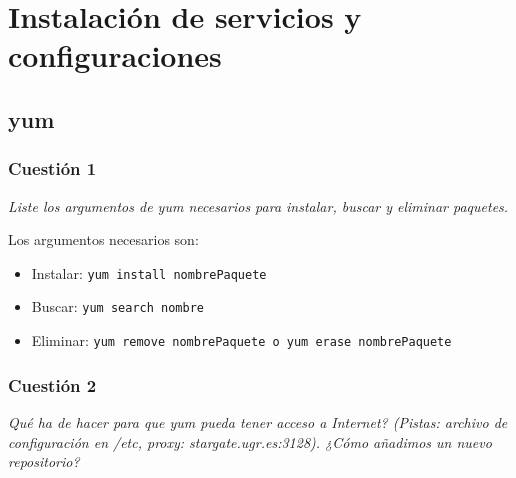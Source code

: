 



\maketitle %
\newpage %
\tableofcontents %
\listoffigures
\listoftables
\newpage


\section{Instalación de servicios y configuraciones}

\subsection{yum}



\subsubsection{Cuestión 1}
\textit{Liste los argumentos de yum necesarios para instalar, buscar y eliminar paquetes.}
\newline

Los argumentos necesarios son: \cite{manyum}
\begin{itemize}
  \item Instalar: \texttt{yum install nombrePaquete}
  \item Buscar: \texttt{yum search nombre}
  \item Eliminar: \texttt{yum remove nombrePaquete o yum erase nombrePaquete}
\end{itemize}






\subsubsection{Cuestión 2}
\textit{Qué ha de hacer para que yum pueda tener acceso a Internet? (Pistas: archivo de configuración en /etc, proxy: stargate.ugr.es:3128). ¿Cómo añadimos un nuevo repositorio?}
\newline


